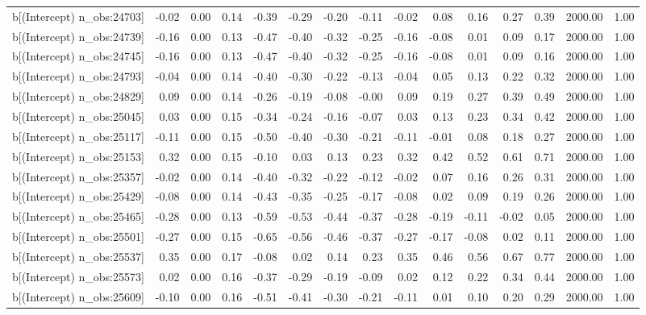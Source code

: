 \begin{table}[ht]
\begin{tabular}{rrrrrrrrrrrrrrr}
  b[(Intercept) n\_obs:24703] & -0.02 & 0.00 & 0.14 & -0.39 & -0.29 & -0.20 & -0.11 & -0.02 & 0.08 & 0.16 & 0.27 & 0.39 & 2000.00 & 1.00 \\ 
  b[(Intercept) n\_obs:24739] & -0.16 & 0.00 & 0.13 & -0.47 & -0.40 & -0.32 & -0.25 & -0.16 & -0.08 & 0.01 & 0.09 & 0.17 & 2000.00 & 1.00 \\ 
  b[(Intercept) n\_obs:24745] & -0.16 & 0.00 & 0.13 & -0.47 & -0.40 & -0.32 & -0.25 & -0.16 & -0.08 & 0.01 & 0.09 & 0.16 & 2000.00 & 1.00 \\ 
  b[(Intercept) n\_obs:24793] & -0.04 & 0.00 & 0.14 & -0.40 & -0.30 & -0.22 & -0.13 & -0.04 & 0.05 & 0.13 & 0.22 & 0.32 & 2000.00 & 1.00 \\ 
  b[(Intercept) n\_obs:24829] & 0.09 & 0.00 & 0.14 & -0.26 & -0.19 & -0.08 & -0.00 & 0.09 & 0.19 & 0.27 & 0.39 & 0.49 & 2000.00 & 1.00 \\ 
  b[(Intercept) n\_obs:25045] & 0.03 & 0.00 & 0.15 & -0.34 & -0.24 & -0.16 & -0.07 & 0.03 & 0.13 & 0.23 & 0.34 & 0.42 & 2000.00 & 1.00 \\ 
  b[(Intercept) n\_obs:25117] & -0.11 & 0.00 & 0.15 & -0.50 & -0.40 & -0.30 & -0.21 & -0.11 & -0.01 & 0.08 & 0.18 & 0.27 & 2000.00 & 1.00 \\ 
  b[(Intercept) n\_obs:25153] & 0.32 & 0.00 & 0.15 & -0.10 & 0.03 & 0.13 & 0.23 & 0.32 & 0.42 & 0.52 & 0.61 & 0.71 & 2000.00 & 1.00 \\ 
  b[(Intercept) n\_obs:25357] & -0.02 & 0.00 & 0.14 & -0.40 & -0.32 & -0.22 & -0.12 & -0.02 & 0.07 & 0.16 & 0.26 & 0.31 & 2000.00 & 1.00 \\ 
  b[(Intercept) n\_obs:25429] & -0.08 & 0.00 & 0.14 & -0.43 & -0.35 & -0.25 & -0.17 & -0.08 & 0.02 & 0.09 & 0.19 & 0.26 & 2000.00 & 1.00 \\ 
  b[(Intercept) n\_obs:25465] & -0.28 & 0.00 & 0.13 & -0.59 & -0.53 & -0.44 & -0.37 & -0.28 & -0.19 & -0.11 & -0.02 & 0.05 & 2000.00 & 1.00 \\ 
  b[(Intercept) n\_obs:25501] & -0.27 & 0.00 & 0.15 & -0.65 & -0.56 & -0.46 & -0.37 & -0.27 & -0.17 & -0.08 & 0.02 & 0.11 & 2000.00 & 1.00 \\ 
  b[(Intercept) n\_obs:25537] & 0.35 & 0.00 & 0.17 & -0.08 & 0.02 & 0.14 & 0.23 & 0.35 & 0.46 & 0.56 & 0.67 & 0.77 & 2000.00 & 1.00 \\ 
  b[(Intercept) n\_obs:25573] & 0.02 & 0.00 & 0.16 & -0.37 & -0.29 & -0.19 & -0.09 & 0.02 & 0.12 & 0.22 & 0.34 & 0.44 & 2000.00 & 1.00 \\ 
  b[(Intercept) n\_obs:25609] & -0.10 & 0.00 & 0.16 & -0.51 & -0.41 & -0.30 & -0.21 & -0.11 & 0.01 & 0.10 & 0.20 & 0.29 & 2000.00 & 1.00 \\ 

\end{tabular}
\end{table}
